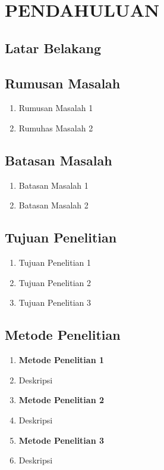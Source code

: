 \chapter{PENDAHULUAN}

\section{Latar Belakang}

\section{Rumusan Masalah}
\begin{enumerate}
    \item Rumusan Masalah 1
    \item Rumuhas Masalah 2
\end{enumerate}

\section{Batasan Masalah}
\begin{enumerate}
    \item Batasan Masalah 1
    \item Batasan Masalah 2
\end{enumerate}

\section{Tujuan Penelitian}
\begin{enumerate}
    \item Tujuan Penelitian 1
    \item Tujuan Penelitian 2
    \item Tujuan Penelitian 3
\end{enumerate}

\section{Metode Penelitian}
\begin{enumerate}
    \item \textbf{Metode Penelitian 1}
    \item[] Deskripsi
    \item \textbf{Metode Penelitian 2}
    \item[] Deskripsi
    \item \textbf{Metode Penelitian 3}
    \item[] Deskripsi
\end{enumerate}

